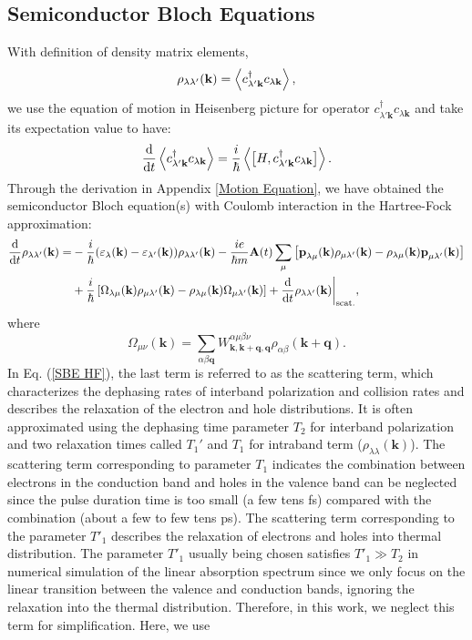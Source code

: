 \documentclass[12pt,english,a4paper]{article}
\newcommand{\dg}{\dagger}
\begin{document}
	\subsection{Semiconductor Bloch Equations}
\quad With definition of density matrix elements,
	\begin{equation}
		\rho_{\lambda \lambda'}(\textbf{k}) = \ev{c^\dg_{\lambda'\textbf{k}} c_{\lambda\textbf{k}}},
	\end{equation}
we use the equation of motion in Heisenberg picture for operator $c^\dg_{\lambda'\textbf{k}} c_{\lambda\textbf{k}}$ and take its expectation value to have:
	\begin{equation}
		\label{Heisenberg eq}
		\dv{}{t}\ev{c^\dg_{\lambda'\textbf{k}} c_{\lambda\textbf{k}}} = \frac{i}{\hbar}\ev{\big[H,c^\dg_{\lambda'\textbf{k}} c_{\lambda\textbf{k}} \big]}.
	\end{equation}
\quad Through the derivation in Appendix \ref{Motion Equation}, we have obtained the semiconductor Bloch equation(s) with Coulomb interaction in the Hartree-Fock approximation:
\begin{align}
	\label{SBE HF}
\dv{ }{t}\rho_{\lambda\lambda'}(\textbf{k}) =& - \frac{i}{\hbar} (\varepsilon_\lambda(\textbf{k}) - \varepsilon_{\lambda'} (\textbf{k}))\rho_{\lambda \lambda'}(\textbf{k}) - \frac{ie}{\hbar m} \textbf{A}(t)\sum_{\mu}\left[\textbf{p}_{\lambda\mu}(\textbf{k})\rho_{\mu \lambda'}(\textbf{k}) - \rho_{\lambda\mu}(\textbf{k})\textbf{p}_{\mu \lambda'}(\textbf{k})\right] \nonumber \\
&+ \frac{i}{\hbar}\left[\Omega_{\lambda \mu}(\textbf{k})\rho_{\mu \lambda'}(\textbf{k}) - \rho_{\lambda\mu}(\textbf{k}) \Omega_{\mu \lambda'} (\textbf{k})\right] +\dv{ }{t}\rho_{\lambda\lambda'}(\textbf{k})\bigg|_{\mathrm{scat.}},
\end{align}
\quad where
\begin{equation}
\Omega_{\mu\nu} (\textbf{k})=\sum_{\alpha \beta \textbf{q}} W^{\alpha \mu \beta \nu}_{\textbf{k},\textbf{k}+\textbf{q},\textbf{q}} \rho_{\alpha\beta} (\textbf{k}+\textbf{q}).
\end{equation}
\quad  In Eq. (\ref{SBE HF}), the last term is referred to as the scattering term, which characterizes the dephasing rates of interband polarization and collision rates and describes the relaxation of the electron and hole distributions. It is often approximated using the dephasing time parameter $T_2$ for interband polarization and two relaxation times called $T_1'$ and $T_1$ for intraband term ($\rho_{\lambda\lambda}(\textbf{k})$). The scattering term corresponding to parameter $T_1$ indicates the combination between electrons in the conduction band and holes in the valence band can be neglected since the pulse duration time is too small (a few tens fs) compared with the combination (about a few to few tens ps)\cite{recombination_Ex}. The scattering term corresponding to the parameter $T'_1$ describes the relaxation of electrons and holes into thermal distribution. The parameter $T'_1$ usually being chosen satisfies $T'_1 \gg T_2$ in numerical simulation of the linear absorption spectrum since we only focus on the linear transition between the valence and conduction bands, ignoring the relaxation into the thermal distribution. Therefore, in this work, we neglect this term for simplification. Here, we use 
\end{document}
